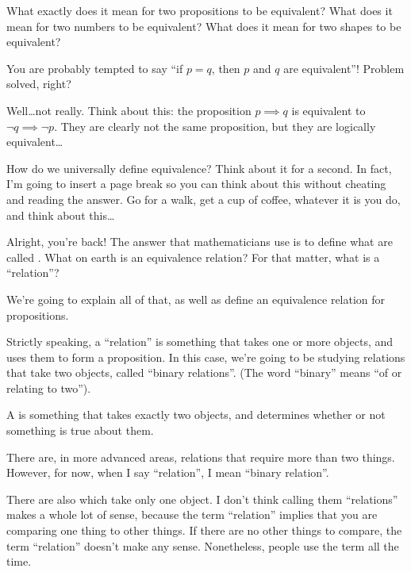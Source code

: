 What exactly does it mean for two propositions to be equivalent? What
does it mean for two numbers to be equivalent? What does it mean for
two shapes to be equivalent?

You are probably tempted to say ``if $p = q$, then $p$ and $q$ are
equivalent''! Problem solved, right?

Well\dots not really. Think about this: the proposition $p \implies q$
is equivalent to $\lnot q \implies \lnot p$. They are clearly not the
same proposition, but they are logically equivalent\dots

How do we universally define equivalence? Think about it for a
second. In fact, I'm going to insert a page break so you can think
about this without cheating and reading the answer. Go for a walk, get
a cup of coffee, whatever it is you do, and think about this\dots

\newpage

Alright, you're back! The answer that mathematicians use is to define
what are called . What on earth is an
equivalence relation? For that matter, what is a ``relation''?

We're going to explain all of that, as well as define an equivalence
relation for propositions.

Strictly speaking, a ``relation'' is something that takes one or more
objects, and uses them to form a proposition. In this case, we're
going to be studying relations that take two objects, called ``binary
relations''. (The word ``binary'' means ``of or relating to two'').

\begin{definition}
  A  is something that takes exactly two
  objects, and determines whether or not something is true about them.
\end{definition}

There are, in more advanced areas, relations that require more than
two things. However, for now, when I say ``relation'', I mean
``binary relation''.

\begin{aside}
  There are also  which take only one object. I
  don't think calling them ``relations'' makes a whole lot of sense,
  because the term ``relation'' implies that you are comparing one
  thing  to other things. If there are no other things
  to compare, the term ``relation'' doesn't make any
  sense. Nonetheless, people use the term all the time.
\end{aside}

